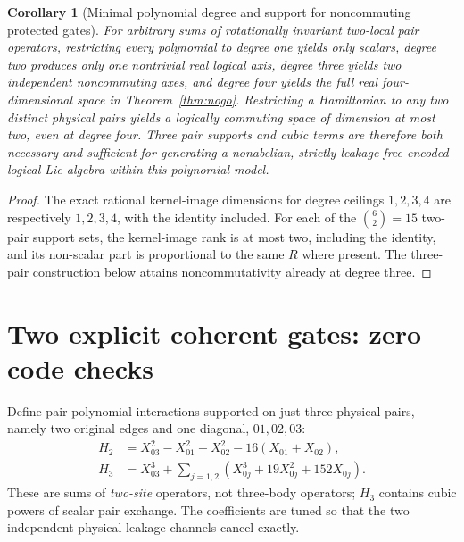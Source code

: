 \documentclass[aps,pra,twocolumn,nofootinbib,superscriptaddress,10pt]{revtex4-2}
\newtheorem{corollary}{Corollary}
\begin{document}
\begin{corollary}[Minimal polynomial degree and support for noncommuting protected gates]\label{cor:minimum}
For arbitrary sums of rotationally invariant two-local pair operators, restricting every polynomial to degree one yields only scalars, degree two produces only one nontrivial real logical axis, degree three yields two independent noncommuting axes, and degree four yields the full real four-dimensional space in Theorem~\ref{thm:nogo}. Restricting a Hamiltonian to any two distinct physical pairs yields a logically commuting space of dimension at most two, even at degree four. Three pair supports and cubic terms are therefore both necessary and sufficient for generating a nonabelian, strictly leakage-free encoded logical Lie algebra within this polynomial model.
\end{corollary}
\begin{proof}
The exact rational kernel-image dimensions for degree ceilings $1,2,3,4$ are respectively $1,2,3,4$, with the identity included. For each of the $\binom62=15$ two-pair support sets, the kernel-image rank is at most two, including the identity, and its non-scalar part is proportional to the same $R$ where present. The three-pair construction below attains noncommutativity already at degree three.\end{proof}

\section{Two explicit coherent gates: zero code checks}
Define pair-polynomial interactions supported on just three physical pairs, namely two original edges and one diagonal, $01,02,03$:
\begin{align}\label{eq:H2}
H_2&=X_{03}^2-X_{01}^2-X_{02}^2-16(X_{01}+X_{02}),\\
H_3&=X_{03}^3+\sum_{j=1,2}(X_{0j}^3+19X_{0j}^2+152X_{0j}).\label{eq:H3}
\end{align}
These are sums of \emph{two-site} operators, not three-body operators; $H_3$ contains cubic powers of scalar pair exchange. The coefficients are tuned so that the two independent physical leakage channels cancel exactly.
\end{document}
